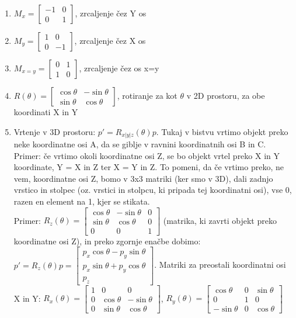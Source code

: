 \documentclass{article}
\begin{document}
\begin{itemize}
\begin{enumerate}
        \item $M_x = \begin{bmatrix} -1 & 0 \\ 0 & 1 \end{bmatrix}$, zrcaljenje čez Y os
        \item $M_y = \begin{bmatrix} 1 & 0 \\ 0 & -1 \end{bmatrix}$, zrcaljenje čez X os
        \item $M_{x=y} = \begin{bmatrix} 0 & 1 \\ 1 & 0 \end{bmatrix}$, zrcaljenje čez os x=y    
        \item $R(\theta) = \begin{bmatrix} \cos{\theta} & -\sin{\theta} \\ \sin{\theta} & \cos{\theta} \end{bmatrix}$, rotiranje za kot $\theta$ v 2D prostoru, za obe koordinati X in Y
        \item Vrtenje v 3D prostoru: $p' = R_{x|y|z}(\theta)p$. Tukaj v bistvu vrtimo objekt preko neke koordinatne osi A, da se giblje v ravnini koordinatnih osi B in C. Primer: če vrtimo okoli koordinatne osi Z, se bo objekt vrtel preko X in Y koordinate, Y = X in Z ter X = Y in Z. To pomeni, da če vrtimo preko, ne vem, koordinatne osi Z, bomo v 3x3 matriki (ker smo v 3D), dali zadnjo vrstico in stolpec (oz. vrstici in stolpcu, ki pripada tej koordinatni osi), vse 0, razen en element na 1, kjer se stikata. \\ Primer: $R_z(\theta) = \begin{bmatrix} 
 \cos{\theta} & -\sin{\theta} & 0 \\ \sin{\theta} & \cos{\theta} & 0 \\ 0 & 0 & 1 \end{bmatrix}$ (matrika, ki zavrti objekt preko koordinatne osi Z), in preko zgornje enačbe dobimo: $p' = R_{z}(\theta)p = \begin{bmatrix} p_x \cos{\theta} - p_y \sin{\theta} \\ p_x \sin{\theta} + p_y \cos{\theta} \\ p_z \end{bmatrix}$. Matriki za preostali koordinatni osi X in Y: $R_x(\theta) = \begin{bmatrix} 1 & 0 & 0 \\ 0 & \cos{\theta} & -\sin{\theta} \\ 0 & \sin{\theta} & \cos{\theta} \end{bmatrix}$, $R_y(\theta) = \begin{bmatrix} 
\cos{\theta} & 0 & \sin{\theta} \\ 0 & 1 & 0 \\ -\sin{\theta} & 0 &\cos{\theta} \end{bmatrix}$
    \end{enumerate}
\end{itemize}
\end{document}
